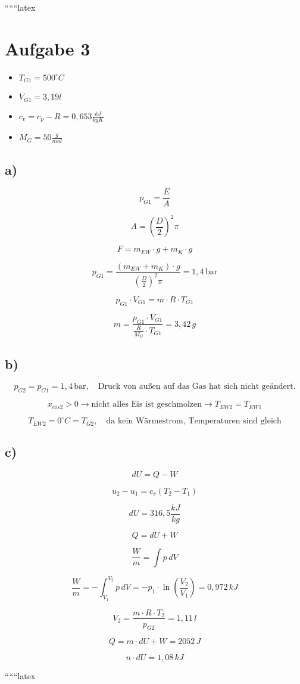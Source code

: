 
``````latex


\section*{Aufgabe 3}

\begin{itemize}
    \item $T_{G1} = 500^\circ C$
    \item $V_{G1} = 3,19 l$
    \item $c_v = c_p - R = 0,653 \frac{kJ}{kgK}$
    \item $M_{G} = 50 \frac{g}{mol}$
\end{itemize}

\subsection*{a)}

\[
p_{G1} = \frac{E}{A}
\]

\[
A = \left(\frac{D}{2}\right)^2 \pi
\]

\[
F = m_{EW} \cdot g + m_{K} \cdot g
\]

\[
p_{G1} = \frac{(m_{EW} + m_{K}) \cdot g}{\left(\frac{D}{2}\right)^2 \pi} = 1,4 \, \text{bar}
\]

\[
p_{G1} \cdot V_{G1} = m \cdot R \cdot T_{G1}
\]

\[
m = \frac{p_{G1} \cdot V_{G1}}{\frac{R}{M_G} \cdot T_{G1}} = 3,42 \, g
\]

\subsection*{b)}

\[
p_{G2} = p_{G1} = 1,4 \, \text{bar}, \quad \text{Druck von außen auf das Gas hat sich nicht geändert.}
\]

\[
x_{eis2} > 0 \rightarrow \text{nicht alles Eis ist geschmolzen} \rightarrow T_{EW2} = T_{EW1}
\]

\[
T_{EW2} = 0^\circ C = T_{G2}, \quad \text{da kein Wärmestrom, Temperaturen sind gleich}
\]

\subsection*{c)}

\[
dU = Q - W
\]

\[
u_2 - u_1 = c_v (T_2 - T_1)
\]

\[
dU = 316,5 \frac{kJ}{kg}
\]

\[
Q = dU + W
\]

\[
\frac{W}{m} = \int p \, dV
\]

\[
\frac{W}{m} = - \int_{V_1}^{V_2} p \, dV = -p_1 \cdot \ln \left(\frac{V_2}{V_1}\right) = 0,972 \, kJ
\]

\[
V_2 = \frac{m \cdot R \cdot T_2}{p_{G2}} = 1,11 \, l
\]

\[
Q = m \cdot dU + W = 2052 \, J
\]

\[
n \cdot dU = 1,08 \, kJ
\]

``````latex



